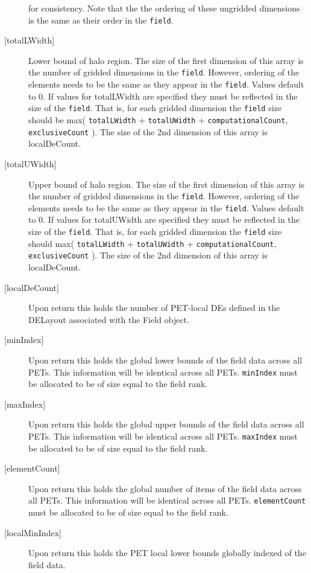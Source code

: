 \begin{description}
   for consistency. Note that the the ordering of
   these ungridded dimensions is the same as their order in the {\tt field}.
   \item [{[totalLWidth]}]
   Lower bound of halo region. The size of the first dimension of this array is the number
   of gridded dimensions in the {\tt field}. However, ordering of the elements
   needs to be the same as they appear in the {\tt field}. Values default
   to 0. If values for totalLWidth are specified they must be reflected in
   the size of the {\tt field}. That is, for each gridded dimension the
   {\tt field} size should be max( {\tt totalLWidth} + {\tt totalUWidth}
   + {\tt computationalCount}, {\tt exclusiveCount} ).
   The size of the 2nd dimension of this array is localDeCount.
   \item [{[totalUWidth]}]
   Upper bound of halo region. The size of the first dimension of this array is the number
   of gridded dimensions in the {\tt field}. However, ordering of the elements
   needs to be the same as they appear in the {\tt field}. Values default
   to 0. If values for totalUWidth are specified they must be reflected in
   the size of the {\tt field}. That is, for each gridded dimension the
   {\tt field} size should max( {\tt totalLWidth} + {\tt totalUWidth}
   + {\tt computationalCount}, {\tt exclusiveCount} ).
   The size of the 2nd dimension of this array is localDeCount.
   \item [{[localDeCount]}]
   Upon return this holds the number of PET-local DEs defined in
   the DELayout associated with the Field object.
   \item[{[minIndex]}]
   Upon return this holds the global lower bounds of the field data across all PETs.
   This information will be identical across all PETs.
   {\tt minIndex} must be allocated to be of size equal to the field rank.
   \item[{[maxIndex]}]
   Upon return this holds the global upper bounds of the field data across all PETs.
   This information will be identical across all PETs.
   {\tt maxIndex} must be allocated to be of size equal to the field rank.
   \item[{[elementCount]}]
   Upon return this holds the global number of items of the field data across all PETs.
   This information will be identical across all PETs.
   {\tt elementCount} must be allocated to be of size equal to the field rank.
   \item[{[localMinIndex]}]
   Upon return this holds the PET local lower bounds globally indexed of the field data.

\end{description}
